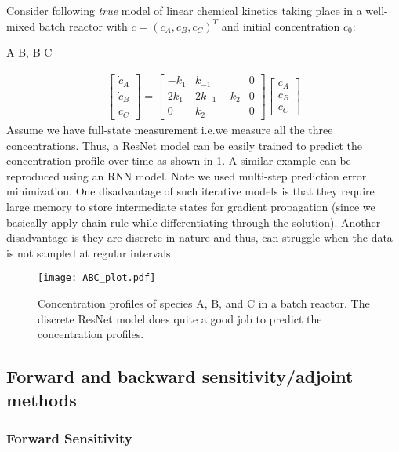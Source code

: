 \documentclass[fontsize=11pt]{article}
\theoremstyle{definition}
\begin{document}
Consider following \textit{true} model of linear chemical kinetics taking place
in a well-mixed batch reactor with $c = (c_A, c_B, c_C)^T$ and initial concentration
$c_0$:
\begin{rxn*}{} 
A  B, \qquad  B \rarrow[k_2] C
\label{rxn:atobtoc}
\end{rxn*}
\begin{gather}
\begin{bmatrix} \dot{c}_A \\ \dot{c}_B \\ \dot{c}_C \end{bmatrix}
=\begin{bmatrix}
    -k_{1} & k_{-1} & 0 \\
    2k_{1} & 2k_{-1} - k_2 & 0 \\
    0 & k_{2} & 0
\end{bmatrix}
\begin{bmatrix}  c_A \\ c_B \\ c_C \end{bmatrix} 
\label{eq:atobtoc}
\end{gather}
Assume we have full-state measurement i.e.we measure all the three concentrations. Thus, 
a ResNet model can be easily trained to predict the concentration profile over 
time as shown in \cref{fig:resnet}. A similar example can be reproduced using an 
RNN model. Note we used multi-step prediction error minimization. One disadvantage 
of such iterative models is that they require large memory
to store intermediate states for gradient propagation (since we basically
apply chain-rule while differentiating through the solution). Another disadvantage is they 
are discrete in nature and thus, can struggle when the data is not sampled at regular intervals.

\begin{figure}
    \centering
    \texttt{[image: ABC\_plot.pdf]} 
    \caption{Concentration profiles of species A, B, and C in a batch reactor. The 
    discrete ResNet model does quite a good job to predict the concentration profiles.}
    \label{fig:resnet}
\end{figure}

\subsection{Forward and backward sensitivity/adjoint methods}
\label{sec:sens}
\subsubsection{Forward Sensitivity}
\end{document}
